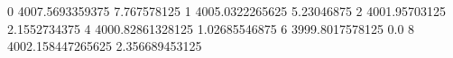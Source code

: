 0 4007.5693359375 7.767578125
1 4005.0322265625 5.23046875
2 4001.95703125 2.1552734375
4 4000.82861328125 1.02685546875
6 3999.8017578125 0.0
8 4002.158447265625 2.356689453125
